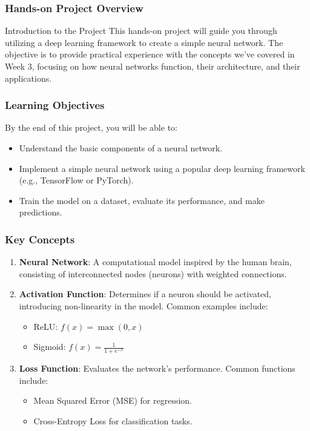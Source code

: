 \documentclass[aspectratio=169]{beamer}
\begin{document}
\begin{frame}[fragile]
    \frametitle{Hands-on Project Overview}
    \begin{block}{Introduction to the Project}
        This hands-on project will guide you through utilizing a deep learning framework to create a simple neural network. The objective is to provide practical experience with the concepts we’ve covered in Week 3, focusing on how neural networks function, their architecture, and their applications.
    \end{block}
\end{frame}

\begin{frame}[fragile]
    \frametitle{Learning Objectives}
    By the end of this project, you will be able to:
    \begin{itemize}
        \item Understand the basic components of a neural network.
        \item Implement a simple neural network using a popular deep learning framework (e.g., TensorFlow or PyTorch).
        \item Train the model on a dataset, evaluate its performance, and make predictions.
    \end{itemize}
\end{frame}

\begin{frame}[fragile]
    \frametitle{Key Concepts}
    \begin{enumerate}
        \item \textbf{Neural Network}: A computational model inspired by the human brain, consisting of interconnected nodes (neurons) with weighted connections.
        
        \item \textbf{Activation Function}: Determines if a neuron should be activated, introducing non-linearity in the model. Common examples include:
        \begin{itemize}
            \item ReLU: $f(x) = \max(0, x)$
            \item Sigmoid: $f(x) = \frac{1}{1 + e^{-x}}$
        \end{itemize}
        
        \item \textbf{Loss Function}: Evaluates the network's performance. Common functions include:
        \begin{itemize}
            \item Mean Squared Error (MSE) for regression.
            \item Cross-Entropy Loss for classification tasks.
        \end{itemize}
    \end{enumerate}
\end{frame}
\end{document}
